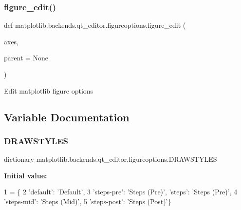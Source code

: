 \subsubsection{\texorpdfstring{figure\+\_\+edit()}{figure\_edit()}}
{\footnotesize\ttfamily def matplotlib.\+backends.\+qt\+\_\+editor.\+figureoptions.\+figure\+\_\+edit (\begin{DoxyParamCaption}\item[{}]{axes,  }\item[{}]{parent = {\ttfamily None} }\end{DoxyParamCaption})}

\begin{DoxyVerb}Edit matplotlib figure options\end{DoxyVerb}
 

\subsection{Variable Documentation}
\mbox{\label{namespacematplotlib_1_1backends_1_1qt__editor_1_1figureoptions_a413e6e7e618aaf7973523af6a4b6500a}} 
\subsubsection{\texorpdfstring{D\+R\+A\+W\+S\+T\+Y\+L\+ES}{DRAWSTYLES}}
{\footnotesize\ttfamily dictionary matplotlib.\+backends.\+qt\+\_\+editor.\+figureoptions.\+D\+R\+A\+W\+S\+T\+Y\+L\+ES}

{\bfseries Initial value\+:}
\begin{DoxyCode}
1 =  \{
2     \textcolor{stringliteral}{'default'}: \textcolor{stringliteral}{'Default'},
3     \textcolor{stringliteral}{'steps-pre'}: \textcolor{stringliteral}{'Steps (Pre)'}, \textcolor{stringliteral}{'steps'}: \textcolor{stringliteral}{'Steps (Pre)'},
4     \textcolor{stringliteral}{'steps-mid'}: \textcolor{stringliteral}{'Steps (Mid)'},
5     \textcolor{stringliteral}{'steps-post'}: \textcolor{stringliteral}{'Steps (Post)'}\}
\end{DoxyCode}
\mbox{\label{namespacematplotlib_1_1backends_1_1qt__editor_1_1figureoptions_a2146aca90dd2f866b64eca98a9337bb6}} 

